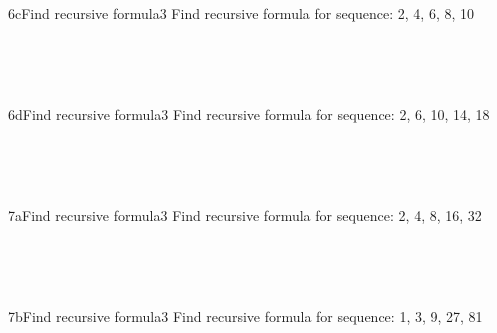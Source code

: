 \documentclass[a4paper,12pt]{book}
\begin{document}
    ~\\
    
    \hrulefill
    
    ~\\
    \begin{answersheetquestion}{6c}{Find recursive formula}{3}
        Find recursive formula for sequence: 2, 4, 6, 8, 10
        \iftoggle{answerkey}{ \begin{answer} $a_{n} = a_{n-1} + 2$ \end{answer} }{ { ~\\ \raisebox{0pt}[2cm][0pt]{  } } }
    \end{answersheetquestion}

    ~\\
    
    \hrulefill
    
    ~\\
    \begin{answersheetquestion}{6d}{Find recursive formula}{3}
        Find recursive formula for sequence: 2, 6, 10, 14, 18
        \iftoggle{answerkey}{ \begin{answer} $a_{n} = a_{n-1} + 4$ \end{answer} }{ { ~\\ \raisebox{0pt}[2cm][0pt]{  } } }
    \end{answersheetquestion}

    ~\\
    
    \hrulefill
    
    ~\\
    \begin{answersheetquestion}{7a}{Find recursive formula}{3}
        Find recursive formula for sequence: 2, 4, 8, 16, 32
        \iftoggle{answerkey}{ \begin{answer} $a_{n} = 2 \cdot a_{n-1}$ \end{answer} }{ { ~\\ \raisebox{0pt}[2cm][0pt]{  } } }
    \end{answersheetquestion}

    ~\\
    
    \hrulefill
    
    ~\\
    \begin{answersheetquestion}{7b}{Find recursive formula}{3}
        Find recursive formula for sequence: 1, 3, 9, 27, 81
        \iftoggle{answerkey}{ \begin{answer} $a_{n} = 3 \cdot a_{n-1}$ \end{answer} }{ { ~\\ \raisebox{0pt}[2cm][0pt]{  } } }
    \end{answersheetquestion}
\end{document}
